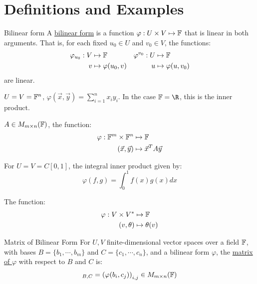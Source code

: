 \documentclass[../Main.tex]{subfiles}
\begin{document}
\section{Definitions and Examples}
\begin{definition}{Bilinear form}
    A \underline{bilinear form} is a function $\varphi : U \times V \mapsto \mathbb{F}$ that is linear in both arguments. That is, for each fixed $u_0 \in U$ and $v_0 \in V$, the functions:
    \begin{align*}
        \varphi_{u_0} : V &\mapsto \mathbb{F} & \varphi^{v_0} : U &\mapsto \mathbb{F} \\
        v &\mapsto \varphi(u_0, v) & u &\mapsto \varphi(u, v_0)
    \end{align*}
    are linear.
\end{definition}
\begin{examples}{
        
    }
    \item $U = V = \mathbb{F}^n$, $\varphi(\vec{x}, \vec{y}) = \sum_{i=1}^{n} x_i y_i$. In the case $\F = \R$, this is the inner product.
    \item $A \in M_{m \times n}(\mathbb{F})$, the function:
        \begin{align*}
            \varphi : \mathbb{F}^m \times \mathbb{F}^n &\mapsto \mathbb{F}\\
            (\vec{x}, \vec{y}) &\mapsto \vec{x}^T A \vec{y}
        \end{align*}
    \item For $U = V = C[0, 1]$, the integral inner product given by:
        \begin{equation*}
            \varphi(f, g) = \int_{0}^{1} f(x)g(x) dx
        \end{equation*}
    \item The function:
        \begin{align*}
            \varphi : V \times V^* &\mapsto \mathbb{F}\\
            (v, \theta) &\mapsto \theta(v)
        \end{align*}
\end{examples}
\begin{definition}{Matrix of Bilinear Form}
    For $U, V$ finite-dimensional vector spaces over a field $\mathbb{F}$, with bases $B = \{b_1, \cdots, b_m\}$ and $C = \{c_1, \cdots, c_n\}$, and a bilinear form $\varphi$, the \underline{matrix of $\varphi$} with respect to $B$ and $C$ is:
    \begin{equation*}
        [\varphi]_{B, C} = \left(\varphi(b_i, c_j)\right)_{i, j} \in M_{m \times n}(\F)
    \end{equation*}
\end{definition}
\end{document}

